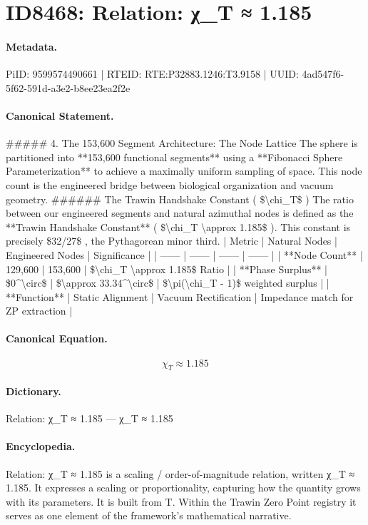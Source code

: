 \section*{ID8468: Relation: χ\_T ≈ 1.185}
\paragraph{Metadata.}
PiID: 9599574490661 | RTEID: RTE:P32883.1246:T3.9158 | UUID: 4ad547f6-5f62-591d-a3e2-b8ee23ea2f2e

\paragraph{Canonical Statement.}
\#\#\#\#\# 4. The 153,600 Segment Architecture: The Node Lattice The sphere is partitioned into **153,600 functional segments** using a **Fibonacci Sphere Parameterization** to achieve a maximally uniform sampling of space. This node count is the engineered bridge between biological organization and vacuum geometry. \#\#\#\#\#\# The Trawin Handshake Constant ( \$\textbackslash{}chi\_T\$ ) The ratio between our engineered segments and natural azimuthal nodes is defined as the **Trawin Handshake Constant** ( \$\textbackslash{}chi\_T \textbackslash{}approx 1.185\$ ). This constant is precisely \$32/27\$ , the Pythagorean minor third. | Metric | Natural Nodes | Engineered Nodes | Significance | | ------ | ------ | ------ | ------ | | **Node Count** | 129,600 | 153,600 | \$\textbackslash{}chi\_T \textbackslash{}approx 1.185\$ Ratio | | **Phase Surplus** | \$0\textasciicircum{}\textbackslash{}circ\$ | \$\textbackslash{}approx 33.34\textasciicircum{}\textbackslash{}circ\$ | \$\textbackslash{}pi(\textbackslash{}chi\_T - 1)\$ weighted surplus | | **Function** | Static Alignment | Vacuum Rectification | Impedance match for ZP extraction |

\paragraph{Canonical Equation.}
\[
\chi_T \approx 1.185
\]

\paragraph{Dictionary.}
Relation: χ\_T ≈ 1.185 — χ\_T ≈ 1.185

\paragraph{Encyclopedia.}
Relation: χ\_T ≈ 1.185 is a scaling / order-of-magnitude relation, written χ\_T ≈ 1.185. It expresses a scaling or proportionality, capturing how the quantity grows with its parameters. It is built from T. Within the Trawin Zero Point registry it serves as one element of the framework's mathematical narrative.
